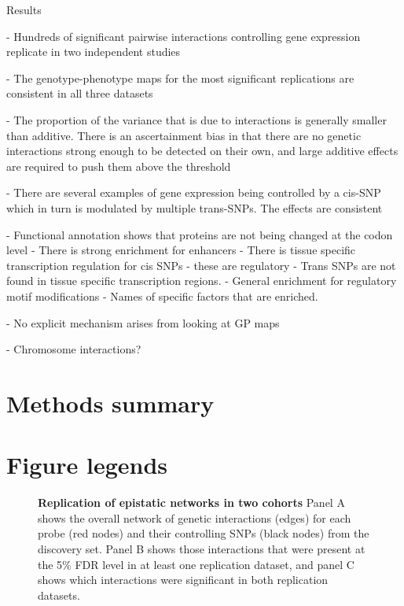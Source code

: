 \documentclass{article}
\begin{document}
Results


- Hundreds of significant pairwise interactions controlling gene expression replicate in two independent studies



- The genotype-phenotype maps for the most significant replications are consistent in all three datasets



- The proportion of the variance that is due to interactions is generally smaller than additive. There is an ascertainment bias in that there are no genetic interactions strong enough to be detected on their own, and large additive effects are required to push them above the threshold



- There are several examples of gene expression being controlled by a cis-SNP which in turn is modulated by multiple trans-SNPs. The effects are consistent 



- Functional annotation shows that proteins are not being changed at the codon level
- There is strong enrichment for enhancers
- There is tissue specific transcription regulation for cis SNPs - these are regulatory
- Trans SNPs are not found in tissue specific transcription regions.
- General enrichment for regulatory motif modifications
- Names of specific factors that are enriched.



- No explicit mechanism arises from looking at GP maps



- Chromosome interactions?



\clearpage
\section{Methods summary}




\clearpage
\section{Figure legends}

\begin{figure}[H]
	\caption{\textbf{Replication of epistatic networks in two cohorts} Panel A shows the overall network of genetic interactions (edges) for each probe (red nodes) and their controlling SNPs (black nodes) from the discovery set. Panel B shows those interactions that were present at the 5\% FDR level in at least one replication dataset, and panel C shows which interactions were significant in both replication datasets.}
	\label{fig:fireworks}
\end{figure}
\end{document}
